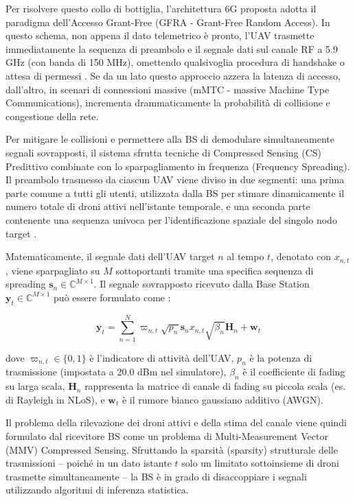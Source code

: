 \documentclass[twoside]{article}
\begin{document}
Per risolvere questo collo di bottiglia, l'architettura 6G proposta adotta il paradigma dell'Accesso Grant-Free (GFRA - Grant-Free Random Access). In questo schema, non appena il dato telemetrico è pronto, l'UAV trasmette immediatamente la sequenza di preambolo e il segnale dati sul canale RF a 5.9 GHz (con banda di 150 MHz), omettendo qualsivoglia procedura di handshake o attesa di permessi \cite{Yu2024}. Se da un lato questo approccio azzera la latenza di accesso, dall'altro, in scenari di connessioni massive (mMTC - massive Machine Type Communications), incrementa drammaticamente la probabilità di collisione e congestione della rete.

Per mitigare le collisioni e permettere alla BS di demodulare simultaneamente segnali sovrapposti, il sistema sfrutta tecniche di Compressed Sensing (CS) Predittivo combinate con lo sparpagliamento in frequenza (Frequency Spreading). Il preambolo trasmesso da ciascun UAV viene diviso in due segmenti: una prima parte comune a tutti gli utenti, utilizzata dalla BS per stimare dinamicamente il numero totale di droni attivi nell'istante temporale, e una seconda parte contenente una sequenza univoca per l'identificazione spaziale del singolo nodo target \cite{Yu2024}.

Matematicamente, il segnale dati dell'UAV target $n$ al tempo $t$, denotato con $x_{n,t}$, viene sparpagliato su $M$ sottoportanti tramite una specifica sequenza di spreading $\mathbf{s}_n \in \mathbb{C}^{M \times 1}$. Il segnale sovrapposto ricevuto dalla Base Station $\mathbf{y}_t \in \mathbb{C}^{M \times 1}$ può essere formulato come \cite{Yu2024}:

\begin{equation}
\mathbf{y}_t = \sum_{n=1}^{N} \varpi_{n,t} \sqrt{p_n} \mathbf{s}_n x_{n,t} \sqrt{\beta_n} \mathbf{H}_n + \mathbf{w}_t
\label{eq:gfra_received_signal}
\end{equation}

dove $\varpi_{n,t} \in \{0, 1\}$ è l'indicatore di attività dell'UAV, $p_n$ è la potenza di trasmissione (impostata a 20.0 dBm nel simulatore), $\beta_n$ è il coefficiente di fading su larga scala, $\mathbf{H}_n$ rappresenta la matrice di canale di fading su piccola scala (es. di Rayleigh in NLoS), e $\mathbf{w}_t$ è il rumore bianco gaussiano additivo (AWGN).

Il problema della rilevazione dei droni attivi e della stima del canale viene quindi formulato dal ricevitore BS come un problema di Multi-Measurement Vector (MMV) Compressed Sensing. Sfruttando la sparsità (sparsity) strutturale delle trasmissioni -- poiché in un dato istante $t$ solo un limitato sottoinsieme di droni trasmette simultaneamente -- la BS è in grado di disaccoppiare i segnali utilizzando algoritmi di inferenza statistica.
\end{document}
